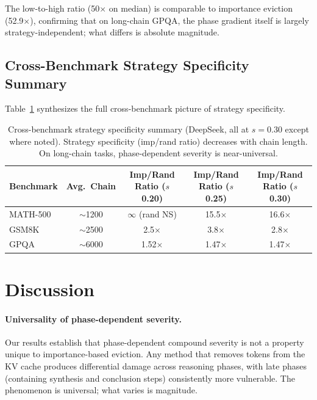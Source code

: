 \documentclass[11pt,a4paper]{article}
\begin{document}
The low-to-high ratio (50$\times$ on median) is comparable to importance eviction (52.9$\times$), confirming that on long-chain GPQA, the phase gradient itself is largely strategy-independent; what differs is absolute magnitude.

\subsection{Cross-Benchmark Strategy Specificity Summary}

Table~\ref{tab:cross_benchmark} synthesizes the full cross-benchmark picture of strategy specificity.

\begin{table}[h]
\centering
\caption{Cross-benchmark strategy specificity summary (DeepSeek, all at $s=0.30$ except where noted). Strategy specificity (imp/rand ratio) decreases with chain length. On long-chain tasks, phase-dependent severity is near-universal.}
\label{tab:cross_benchmark}
\begin{tabular}{lcccc}
\toprule
Benchmark & Avg.\ Chain & Imp/Rand Ratio ($s$0.20) & Imp/Rand Ratio ($s$0.25) & Imp/Rand Ratio ($s$0.30) \\
\midrule
MATH-500 & $\sim$1200 & $\infty$ (rand NS) & 15.5$\times$ & 16.6$\times$ \\
GSM8K & $\sim$2500 & 2.5$\times$ & 3.8$\times$ & 2.8$\times$ \\
GPQA & $\sim$6000 & 1.52$\times$ & 1.47$\times$ & 1.47$\times$ \\
\bottomrule
\end{tabular}
\end{table}

\section{Discussion}

\paragraph{Universality of phase-dependent severity.}
Our results establish that phase-dependent compound severity is not a property unique to importance-based eviction. Any method that removes tokens from the KV cache produces differential damage across reasoning phases, with late phases (containing synthesis and conclusion steps) consistently more vulnerable. The phenomenon is universal; what varies is magnitude.
\end{document}
